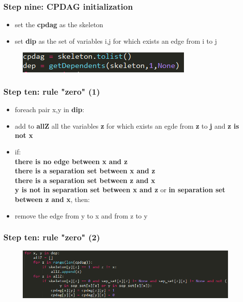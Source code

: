 \documentclass[xcolor ={table,usenames,dvipsnames}]{beamer}
\theoremstyle{definition}
\begin{document}
\begin{frame}
\frametitle{Step nine: CPDAG initialization}
\begin{itemize}
	\item set the \textbf{cpdag} as the skeleton
	\item set \textbf{dip} as the set of variables i,j for which exists an edge from i to j
\end{itemize}
	\begin{figure}[h!]
		\centering
		\includegraphics[scale=0.8]{img/cpdaginit.PNG}
		\label{Interfacce di un CS}
	\end{figure}
\end{frame}
\begin{frame}
\frametitle{Step ten: rule "zero" (1)}
\begin{itemize}
	\item foreach pair x,y in \textbf{dip}:
	\item add to \textbf{allZ} all the variables \textbf{z} for which exists an egde from \textbf{z} to \textbf{j} and \textbf{z is not x}
	\item if:\\\textbf{there is no edge between x and z}\\ \textbf{there is a separation set between x and z}\\\textbf{there is a separation set between z and x}\\\textbf{y is not in separation set between x and z} or \textbf{in separation set between z and x}, then:
	\item remove the edge from y to x and from z to y
\end{itemize}
\end{frame}
\begin{frame}
\frametitle{Step ten: rule "zero" (2)}
	\begin{figure}[h!]
		\centering
		\includegraphics[scale=0.52]{img/rulezero.PNG}
		\label{Interfacce di un CS}
	\end{figure}
\end{frame}
\end{document}
